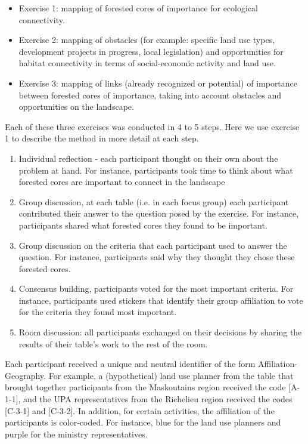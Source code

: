 \begin{itemize}
  \item Exercise 1: mapping of forested cores of importance for ecological connectivity.
  \item Exercise 2: mapping of obstacles (for example: specific land use types, development projects in progress, local legislation) and opportunities for habitat connectivity in terms of social-economic activity and land use.
  \item Exercise 3: mapping of links (already recognized or potential) of importance between forested cores of importance, taking into account obstacles and opportunities on the landscape.
\end{itemize}

Each of these three exercises was conducted in 4 to 5 steps. Here we use exercise 1 to describe the method in more detail at each step.

\begin{enumerate}
\item Individual reflection - each participant thought on their own about the problem at hand. For instance, participants took time to think about what forested cores are important to connect in the landscape
\item Group discussion, at each table (i.e. in each focus group) each participant contributed their answer to the question posed by the exercise. For instance, participants shared what forested cores they found to be important.
\item Group discussion on the criteria that each participant used to answer the question. For instance, participants said why they thought they chose these forested cores.
\item Consensus building, participants voted for the most important criteria. For instance, participants used stickers that identify their group affiliation to vote for the criteria they found most important.
\item Room discussion: all participants exchanged on their decisions by sharing the results of their table’s work to the rest of the room.
\end{enumerate}

Each participant received a unique and neutral identifier of the form Affiliation-Geography. For example, a (hypothetical) land use planner from the table that brought together participants from the Maskoutains region received the code [A-1-1], and the UPA representatives from the Richelieu region received the codes [C-3-1] and [C-3-2]. In addition, for certain activities, the affiliation of the participants is color-coded. For instance, blue for the land use planners and purple for the ministry representatives.

